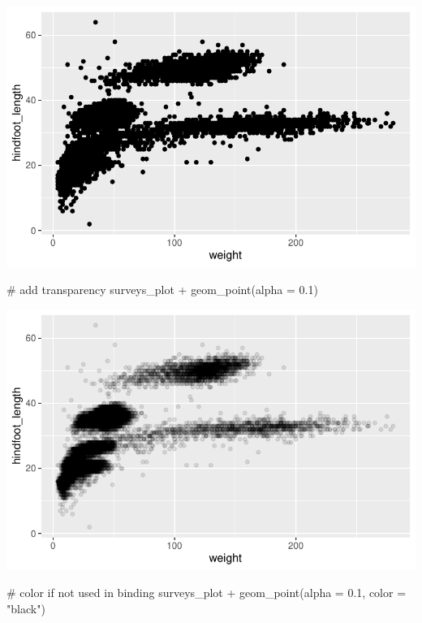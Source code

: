 \documentclass[
  letterpaper,
  DIV=11,
  numbers=noendperiod]{scrreprt}
\newenvironment{Shaded}{\begin{snugshade}}{\end{snugshade}}
\newcommand{\AttributeTok}[1]{\textcolor[rgb]{0.40,0.45,0.13}{#1}}
\newcommand{\CommentTok}[1]{\textcolor[rgb]{0.37,0.37,0.37}{#1}}
\newcommand{\FloatTok}[1]{\textcolor[rgb]{0.68,0.00,0.00}{#1}}
\newcommand{\FunctionTok}[1]{\textcolor[rgb]{0.28,0.35,0.67}{#1}}
\newcommand{\NormalTok}[1]{\textcolor[rgb]{0.00,0.23,0.31}{#1}}
\newcommand{\SpecialCharTok}[1]{\textcolor[rgb]{0.37,0.37,0.37}{#1}}
\newcommand{\StringTok}[1]{\textcolor[rgb]{0.13,0.47,0.30}{#1}}
\begin{document}
\includegraphics{src/notebooks/r_files/figure-pdf/unnamed-chunk-46-1.pdf}

\begin{Shaded}
\begin{Highlighting}[]
\CommentTok{\# add transparency}
\NormalTok{surveys\_plot }\SpecialCharTok{+} \FunctionTok{geom\_point}\NormalTok{(}\AttributeTok{alpha =} \FloatTok{0.1}\NormalTok{)}
\end{Highlighting}
\end{Shaded}

\includegraphics{src/notebooks/r_files/figure-pdf/unnamed-chunk-46-2.pdf}

\begin{Shaded}
\begin{Highlighting}[]
\CommentTok{\# color if not used in binding}
\NormalTok{surveys\_plot }\SpecialCharTok{+} \FunctionTok{geom\_point}\NormalTok{(}\AttributeTok{alpha =} \FloatTok{0.1}\NormalTok{, }\AttributeTok{color =} \StringTok{"black"}\NormalTok{)}
\end{Highlighting}
\end{Shaded}
\end{document}
